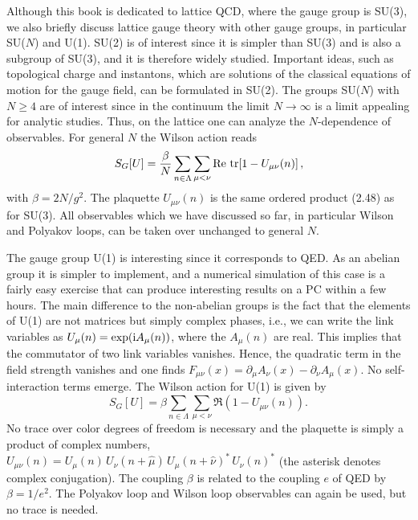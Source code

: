 Although this book is dedicated to lattice QCD, where the gauge group is SU(3),
we also briefly discuss lattice gauge theory with other gauge groups, in
particular SU($N$) and U(1). SU(2) is of interest since it is simpler than
SU(3) and is also a subgroup of SU(3), and it is therefore widely studied.
Important ideas, such as topological charge and instantons, which are solutions
of the classical equations of motion for the gauge field, can be formulated in
SU(2). The groups SU($N$) with $N \geq 4$ are of interest since in the
continuum the limit $N \to \infty$ is a limit appealing for analytic studies.
Thus, on the lattice one can analyze the $N$-dependence of observables. For
general $N$ the Wilson action reads
\begin{equation}
  S_G[U] = \frac{\beta}{N}\sum_{n\in\Lambda}\sum_{\mu<\nu}
    \operatorname{Re}\,\operatorname{tr}\!\left[1 - U_{\mu\nu}(n)\right] ,
\end{equation}
with $\beta = 2N/g^2$. The plaquette $U_{\mu\nu}(n)$ is the same ordered product
(2.48) as for SU(3). All observables which we have discussed so far, in
particular Wilson and Polyakov loops, can be taken over unchanged to general
$N$.

The gauge group U(1) is interesting since it corresponds to QED. As an abelian
group it is simpler to implement, and a numerical simulation of this case is a
fairly easy exercise that can produce interesting results on a PC within a few
hours. The main difference to the non-abelian groups is the fact that the
elements of U(1) are not matrices but simply complex phases, i.e., we can write
the link variables as $U_\mu(n) = \exp(\mathrm{i} A_\mu(n))$, where the $A_\mu(n)$ are
real. This implies that the commutator of two link variables vanishes. Hence,
the quadratic term in the field strength vanishes and one finds
$F_{\mu\nu}(x) = \partial_\mu A_\nu(x) - \partial_\nu A_\mu(x)$. No
self-interaction terms emerge. The Wilson action for U(1) is given by
\begin{equation}
  S_G[U] = \beta\sum_{n\in\Lambda}\sum_{\mu<\nu}
    \Re\!\left(1 - U_{\mu\nu}(n)\right) .
\end{equation}
No trace over color degrees of freedom is necessary and the plaquette is simply
a product of complex numbers,
$U_{\mu\nu}(n) = U_\mu(n)\,U_\nu(n+\hat\mu)\,U_\mu(n+\hat\nu)^*\,U_\nu(n)^*$
(the asterisk denotes complex conjugation). The coupling $\beta$ is related to
the coupling $e$ of QED by $\beta = 1/e^2$. The Polyakov loop and Wilson loop
observables can again be used, but no trace is needed.

